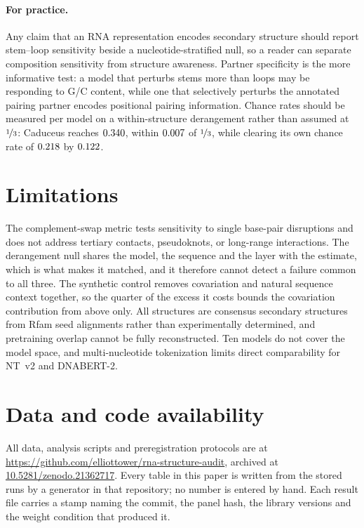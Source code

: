 \documentclass{article}
\begin{document}
\paragraph{For practice.} Any claim that an RNA representation encodes secondary
structure should report stem--loop sensitivity beside a nucleotide-stratified
null, so a reader can separate composition sensitivity from structure awareness.
Partner specificity is the more informative test: a model that perturbs stems
more than loops may be responding to G/C content, while one that selectively
perturbs the annotated pairing partner encodes positional pairing information.
Chance rates should be measured per model on a within-structure derangement
rather than assumed at $\nicefrac{1}{3}$: Caduceus reaches
$0.340{}$, within $0.007{}$ of
$\nicefrac{1}{3}$, while clearing its own chance rate of
$0.218{}$ by $0.122{}$.

\section{Limitations}
\label{sec:limitations}

The complement-swap metric tests sensitivity to single base-pair disruptions and
does not address tertiary contacts, pseudoknots, or long-range interactions. The
derangement null shares the model, the sequence and the layer with the estimate,
which is what makes it matched, and it therefore cannot detect a failure common
to all three. The synthetic control removes covariation and natural sequence
context together, so the quarter of the excess it costs bounds the covariation
contribution from above only. All structures are consensus secondary structures
from Rfam seed alignments rather than experimentally determined, and pretraining
overlap cannot be fully reconstructed. Ten models do not cover the model space,
and multi-nucleotide tokenization limits direct comparability for NT~v2 and
DNABERT-2.

\section*{Data and code availability}

All data, analysis scripts and preregistration protocols are at
\url{https://github.com/elliottower/rna-structure-audit}, archived at
\href{https://doi.org/10.5281/zenodo.21362717}{10.5281/zenodo.21362717}.
Every table in this paper is written from the stored runs by a generator in
that repository; no number is entered by hand. Each result file carries a stamp
naming the commit, the panel hash, the library versions and the weight
condition that produced it.
\end{document}
